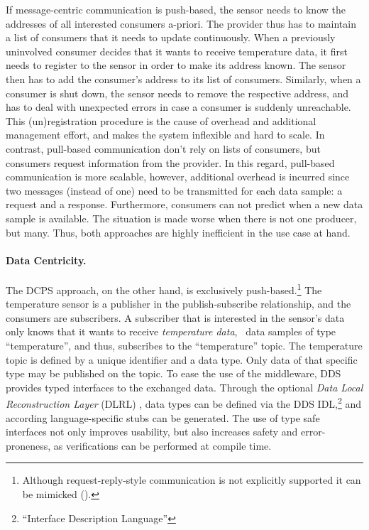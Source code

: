 If message-centric communication is push-based, the sensor needs to know the addresses of all interested consumers a-priori. The provider thus has to maintain a list of consumers that it needs to update continuously. When a previously uninvolved consumer decides that it wants to receive temperature data, it first needs to register to the sensor in order to make its address known. The sensor then has to add the consumer's address to its list of consumers. Similarly, when a consumer is shut down, the sensor needs to remove the respective address, and has to deal with unexpected errors in case a consumer is suddenly unreachable. This (un)registration procedure is the cause of overhead and additional management effort, and makes the system inflexible and hard to scale. In contrast, pull-based communication don't rely on lists of consumers, but consumers request information from the provider. In this regard, pull-based communication is more scalable, however, additional overhead is incurred since two messages (instead of one) need to be transmitted for each data sample: a request and a response. Furthermore, consumers can not predict when a new data sample is available. The situation is made worse when there is not one producer, but many. Thus, both approaches are highly inefficient in the use case at hand.

\paragraph{Data Centricity.} The DCPS approach, on the other hand, is exclusively push-based.\footnote{Although request-reply-style communication is not explicitly supported it can be mimicked (\cf {}).} The temperature sensor is a publisher in the publish-subscribe relationship, and the consumers are subscribers. A subscriber that is interested in the sensor's data only knows that it wants to receive \emph{temperature data}, \ie\ data samples of type ``temperature'', and thus, subscribes to the ``temperature'' topic. 
The temperature topic is defined by a unique identifier and a data type. Only data of that specific type may be published on the topic. To ease the use of the middleware, DDS provides typed interfaces to the exchanged data. Through the optional \emph{Data Local Reconstruction Layer} (DLRL) \cite{dlrl-1.4-standard}, data types can be defined via the DDS IDL,\footnote{``Interface Description Language''} and according language-specific stubs can be generated. The use of type safe interfaces not only improves usability, but also increases safety and error-proneness, as verifications can be performed at compile time.


